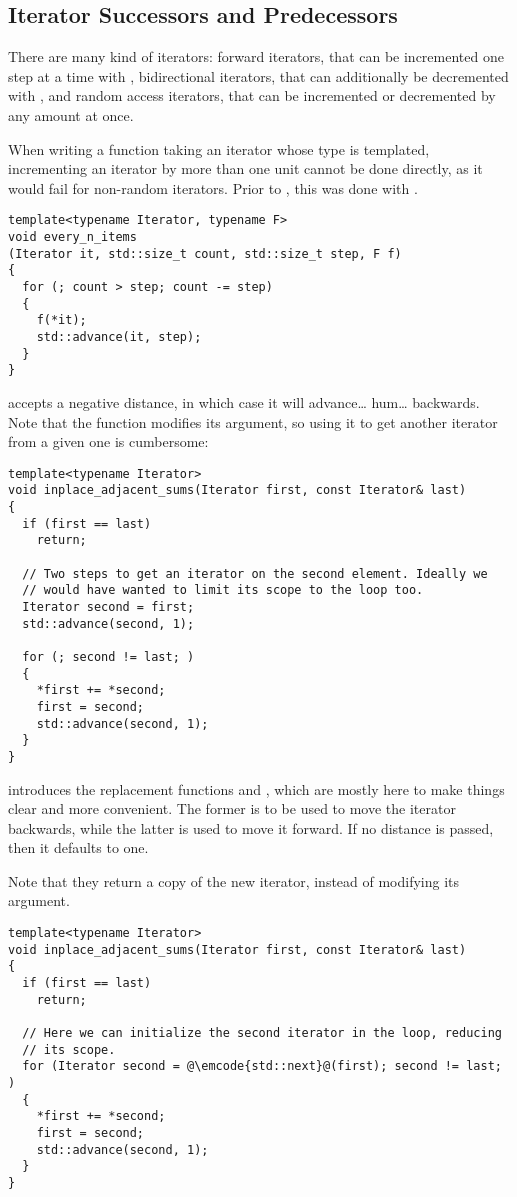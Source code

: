 \subsection{Iterator Successors and Predecessors}

\problemtitle

There are many kind of iterators: forward iterators, that can be
incremented one step at a time with , bidirectional
iterators, that can additionally be decremented with
, and random access iterators, that can be
incremented or decremented by any amount at once.

When writing a function taking an iterator whose type is templated,
incrementing an iterator by more than one unit cannot be done
directly, as it would fail for non-random iterators. Prior to ,
this was done with .

\begin{lstlisting}
template<typename Iterator, typename F>
void every_n_items
(Iterator it, std::size_t count, std::size_t step, F f)
{
  for (; count > step; count -= step)
  {
    f(*it);
    std::advance(it, step);
  }
}
\end{lstlisting}

 accepts a negative distance, in which case it
will advance… hum… backwards. Note that the function modifies its
argument, so using it to get another iterator from a given one is
cumbersome:

\begin{lstlisting}
template<typename Iterator>
void inplace_adjacent_sums(Iterator first, const Iterator& last)
{
  if (first == last)
    return;

  // Two steps to get an iterator on the second element. Ideally we
  // would have wanted to limit its scope to the loop too.
  Iterator second = first;
  std::advance(second, 1);

  for (; second != last; )
  {
    *first += *second;
    first = second;
    std::advance(second, 1);
  }
}
\end{lstlisting}

\solutiontitle

%
%
 introduces the replacement functions  and
, which are mostly here to make things clear and
more convenient. The former is to be used to move the iterator
backwards, while the latter is used to move it forward. If no distance
is passed, then it defaults to one.

Note that they return a copy of the new iterator, instead of modifying
its argument.

\begin{lstlisting}
template<typename Iterator>
void inplace_adjacent_sums(Iterator first, const Iterator& last)
{
  if (first == last)
    return;

  // Here we can initialize the second iterator in the loop, reducing
  // its scope.
  for (Iterator second = @\emcode{std::next}@(first); second != last; )
  {
    *first += *second;
    first = second;
    std::advance(second, 1);
  }
}
\end{lstlisting}
